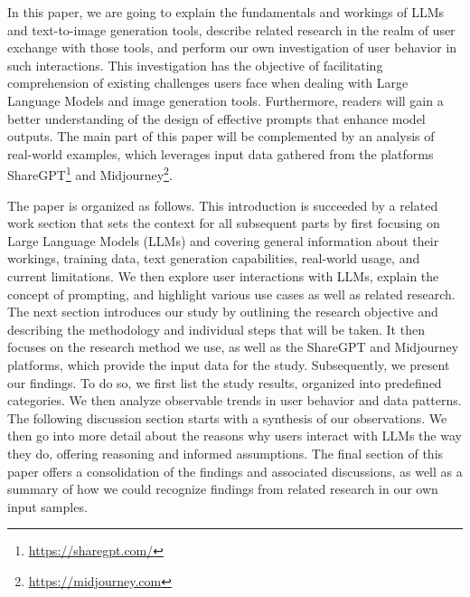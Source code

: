 In this paper, we are going to explain the fundamentals and workings of LLMs and text-to-image
generation tools,
describe related research in the realm of user exchange with those tools, and perform our own
investigation of user behavior in such interactions.
This investigation has the objective of facilitating comprehension of existing challenges users
face when dealing with Large Language Models and image generation tools.
Furthermore, readers will gain a better understanding of the design of effective prompts that
enhance model outputs.
The main part of this paper will be complemented by an analysis of real-world examples, which
leverages input data gathered from the platforms ShareGPT\footnote{\url{https://sharegpt.com/}} and
Midjourney\footnote{\url{https://midjourney.com}}.

The paper is organized as follows.
This introduction is succeeded by a related work section that sets the context for all subsequent
parts by first focusing on Large Language Models (LLMs) and covering general information about
their workings, training data, text generation capabilities, real-world usage, and current limitations.
We then explore user interactions with LLMs, explain the concept of prompting, and highlight
various use cases as well as related research.
%
The next section introduces our study by outlining the research objective and
describing the methodology and individual steps that will be taken.
It then focuses on the research method we use, as well as the ShareGPT and Midjourney platforms,
which provide the input data for the study.
%
Subsequently, we present our findings.
To do so, we first list the study results, organized into predefined categories.
We then analyze observable trends in user behavior and data patterns.
%
The following discussion section starts with a synthesis of our observations.
We then go into more detail about the reasons why users interact with LLMs the way they do,
offering reasoning and informed assumptions.
%
The final section of this paper offers a consolidation of the findings and associated discussions,
as well as a summary of how we could recognize findings from related research in our own input
samples.